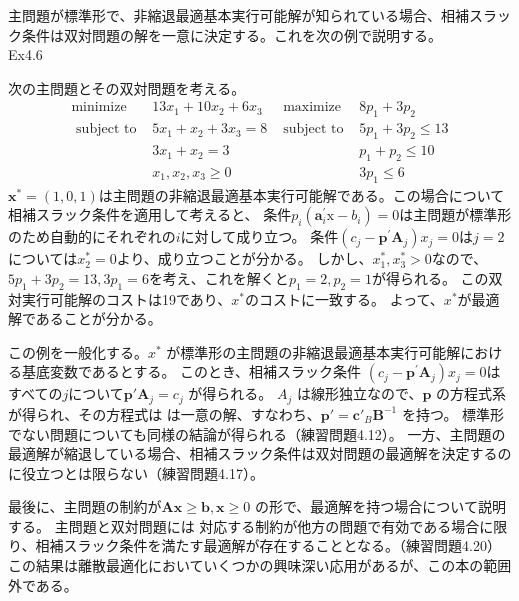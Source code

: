 \documentclass{jsarticle}
\begin{document}
主問題が標準形で、非縮退最適基本実行可能解が知られている場合、相補スラック条件は双対問題の解を一意に決定する。これを次の例で説明する。\\
Ex4.6\par
次の主問題とその双対問題を考える。
\begin{equation}
  \begin{array}{rrrr}
  \operatorname{minimize} & 13 x_{1}+10 x_{2}+6 x_{3} & \text { maximize } & 8 p_{1}+3 p_{2} \\
  \text { subject to } & 5 x_{1}+x_{2}+3 x_{3}=8 & \text { subject to }& 5 p_{1}+3 p_{2} \leq 13 \\
  & 3 x_{1}+x_{2} =3 && p_{1}+p_{2} \leq 10 \\
  & x_{1}, x_{2}, x_{3} \geq 0 && 3 p_{1}  \leq 6
  \end{array}
\end{equation}
$\bm{x}^*=(1,0,1)$は主問題の非縮退最適基本実行可能解である。この場合について相補スラック条件を適用して考えると、
条件$p_{i}\left(\mathbf{a}_{i}^{\prime} \mathrm{x}-b_{i}\right)=0$は主問題が標準形のため自動的にそれぞれの$i$に対して成り立つ。
条件$\left(c_{j}-\mathbf{p}^{\prime} \mathbf{A}_{j}\right) x_{j}=0$は$j=2$については$x^*_2=0$より、成り立つことが分かる。
しかし、$x^*_1,x^*_3 > 0$なので、$5p_1+3p_2=13,3p_1=6$を考え、これを解くと$p_1=2,p_2=1$が得られる。
この双対実行可能解のコストは19であり、$x^*$のコストに一致する。
よって、$x^*$が最適解であることが分かる。

この例を一般化する。$x^*$ が標準形の主問題の非縮退最適基本実行可能解における基底変数であるとする。 このとき、相補スラック条件
$\left(c_{j}-\mathbf{p}^{\prime} \mathbf{A}_{j}\right) x_{j}=0$はすべての$j$について$\bm{p}'\bm{A}_j = c_j$ が得られる。
$A_j$ は線形独立なので、$\bm{p}$ の方程式系が得られ、その方程式は
は一意の解、すなわち、$\bm{p}' = \bm{c}'_B\bm{B}^{-1}$ を持つ。
標準形でない問題についても同様の結論が得られる（練習問題4.12）。
一方、主問題の最適解が縮退している場合、相補スラック条件は双対問題の最適解を決定するのに役立つとは限らない（練習問題4.17）。

最後に、主問題の制約が$\bm{Ax}\geq \bm{b}, \bm{x} \geq 0$ の形で、最適解を持つ場合について説明する。
主問題と双対問題には 対応する制約が他方の問題で有効である場合に限り、相補スラック条件を満たす最適解が存在することとなる。（練習問題4.20）
この結果は離散最適化においていくつかの興味深い応用があるが、この本の範囲外である。

\newpage
\end{document}
